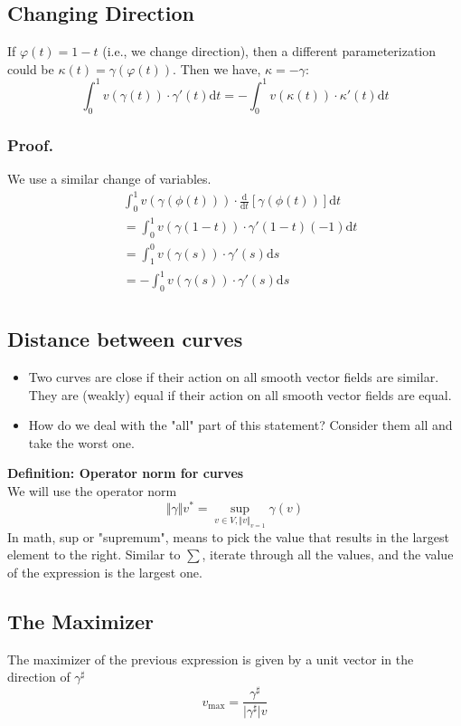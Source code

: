 \documentclass[10pt]{article}
\begin{document}
\subsection*{Changing Direction}
If $\varphi(t) = 1 - t$ (i.e., we change direction), then a different parameterization could be $\kappa(t) = \gamma(\varphi(t))$.  Then we have, $\kappa = -\gamma$:
\[\int_0^1 v(\gamma(t)) \cdot \gamma'(t) \text{d}t = - \int_0^1 v(\kappa(t)) \cdot \kappa'(t) \text{d}t\]

\subsubsection*{Proof.}
We use a similar change of variables.  
\begin{align*}
    &\int_0^1 v(\gamma(\phi(t))) \cdot \frac{\text{d}}{\text{d}t}[\gamma(\phi(t))] \text{d}t\\
    &= \int_0^1 v(\gamma(1 - t)) \cdot \gamma'(1 - t) (-1) \text{d}t\\
    &= \int_1^0 v(\gamma(s)) \cdot \gamma'(s) \text{d}s \\
    &= -\int_0^1 v(\gamma(s)) \cdot \gamma'(s) \text{d}s \\
\end{align*}

\subsection*{Distance between curves}
\begin{itemize}
    \item Two curves are close if their action on all smooth vector fields are similar.  They are (weakly) equal if their action on all smooth vector fields are equal.
    \item How do we deal with the "all" part of this statement?  Consider them all and take the worst one.
\end{itemize}
\textbf{Definition: Operator norm for curves}\\
We will use the operator norm
\[\Vert \gamma \Vert v^* = \sup_{v \in V, \Vert v \Vert_{v = 1}} \gamma(v)\]
In math, sup or "supremum", means to pick the value that results in the largest element to the right.  Similar to $\sum$, iterate through all the values, and the value of the expression is the largest one.


\subsection*{The Maximizer}
The maximizer of the previous expression is given by a unit vector in the direction of $\gamma^\sharp$
\[v_{\text{max}} = \frac{\gamma^\sharp}{\vert \gamma^\sharp \vert v}\]
\end{document}

